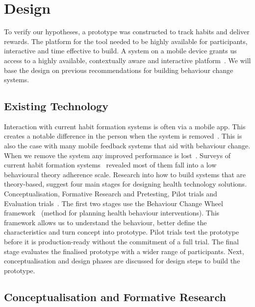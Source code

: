 
\newpage
\section{Design}

To verify our hypotheses, a prototype was constructed to track habits and deliver rewards. The platform for the tool needed to be highly available for participants, interactive and time effective to build.
A system on a mobile device grants us access to a highly available, contextually aware and interactive platform~\cite{article_my_phone_is_part_of_my_soul, article_mhealth}. We will base the design on previous recommendations for building behaviour change systems.

\subsection{Existing Technology}
Interaction with current habit formation systems is often via a mobile app. This creates a notable difference in the person when the system is removed~\cite{article_my_phone_is_part_of_my_soul}.
This is also the case with many mobile feedback systems that aid with behaviour change.
When we remove the system any improved performance is lost~\cite{article_dont_kick_habit, article_realtime_feedback_improving_medication_taking}. Surveys of current habit formation systems~\cite{survey_on_apps_2,survey_on_current_apps_of_steel, article_mhealth} revealed most of them fall into a low behavioural theory adherence scale.
Research into how to build systems that are theory-based, suggest four main stages for designing health technology solutions. Conceptualisation, Formative Research and Pretesting,
Pilot trials and Evaluation trials~\cite{article_mhealth}. The first two stages use the Behaviour Change Wheel framework~\cite{article_behaviour_change_wheel}
(method for planning health behaviour interventions). This framework allows us to understand the behaviour, better define the characteristics and turn concept into prototype.
Pilot trials test the prototype before it is production-ready without the commitment of a full trial. The final stage evaluates the finalised prototype with a wider range of participants. Next, conceptualisation and design phases are discussed for design steps to build the prototype.

\subsection*{Conceptualisation and Formative Research}

